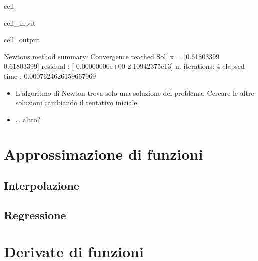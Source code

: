 \documentclass[letterpaper,10pt,italian]{jupyterBook}
\begin{document}
\begin{sphinxuseclass}{cell}
\begin{sphinxVerbatimInput}
\begin{sphinxuseclass}{cell_input}
\end{sphinxuseclass}\end{sphinxVerbatimInput}
\begin{sphinxVerbatimOutput}

\begin{sphinxuseclass}{cell_output}
\begin{sphinxVerbatim}[commandchars=\\\{\}]
Newton\PYGZsq{}s method summary: 
Convergence reached
Sol, x = [\PYGZhy{}0.61803399 \PYGZhy{}0.61803399]
residual     : [ 0.00000000e+00 \PYGZhy{}2.10942375e\PYGZhy{}13]
n. iterations: 4
elapsed time : 0.0007624626159667969
\end{sphinxVerbatim}

\end{sphinxuseclass}\end{sphinxVerbatimOutput}

\end{sphinxuseclass}\begin{itemize}
\item {} 
\sphinxAtStartPar
{} L’algoritmo di Newton trova solo una soluzione del problema. Cercare le altre soluzioni cambiando il tentativo iniziale.

\item {} 
\sphinxAtStartPar
{} … altro?

\end{itemize}

\sphinxstepscope


\chapter{Approssimazione di funzioni}
\label{\detokenize{ch/numerics/approximation:approssimazione-di-funzioni}}\label{\detokenize{ch/numerics/approximation::doc}}

\section{Interpolazione}
\label{\detokenize{ch/numerics/approximation:interpolazione}}

\section{Regressione}
\label{\detokenize{ch/numerics/approximation:regressione}}
\sphinxstepscope


\chapter{Derivate di funzioni}
\label{\detokenize{ch/numerics/derivatives:derivate-di-funzioni}}\label{\detokenize{ch/numerics/derivatives::doc}}
\end{document}
